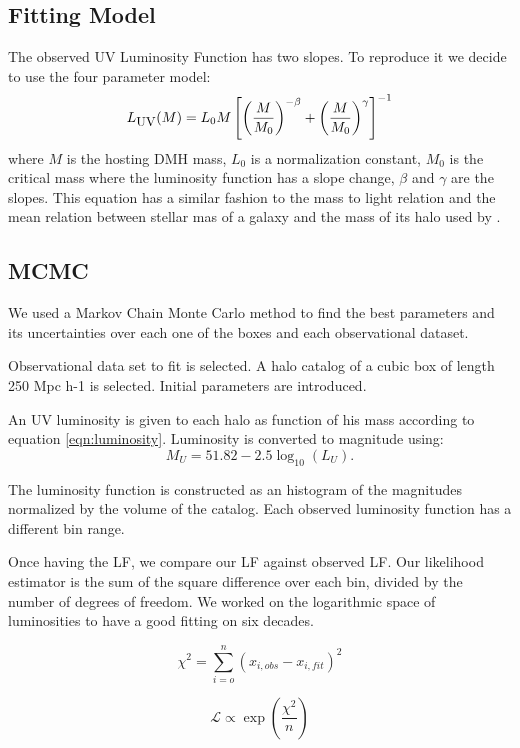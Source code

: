 \subsection{Fitting Model}

The observed UV Luminosity Function has two slopes. To reproduce it we decide to use the four parameter model:
  \begin{equation}\label{eqn:luminosity}
  L_{\textrm{\small{UV}}} (M) = L_{0} M \left[ \left( \frac{M}{M_0}\right)^{-\beta} 
		   + \left( \frac{M}{M_0}\right)^{\gamma} 
               \right]^{-1}
  \end{equation}
where $M$ is the hosting DMH mass, $L_{0}$ is a normalization constant, $M_0$
is the critical mass where the luminosity function has a slope change, 
$\beta$ and $\gamma$ are the slopes. This equation has a similar fashion to the
mass to light relation \citep{vandenbosch03} and the mean relation between
stellar mas of a galaxy and the mass of its halo used by \citet{moster10}.


\subsection{MCMC}
We used a Markov Chain Monte Carlo method to find the best parameters and its 
uncertainties over each one of the boxes and each observational dataset.

Observational data set to fit is selected.
A halo catalog of a cubic box of length 250 Mpc h-1 is selected.
Initial parameters are introduced.

An UV luminosity is given to each halo as function of his mass according to equation
 \ref{eqn:luminosity}.
Luminosity is converted to magnitude using:
  \[ M_{U} = 51.82 - 2.5 \log_{10}(L_{U}). \]

The luminosity function is constructed as an histogram of the magnitudes normalized by 
the volume of the catalog. Each observed luminosity function has a different bin range.

Once having the LF, we compare our LF against observed LF. Our likelihood estimator is 
the sum of the square difference over each bin, divided by the number of degrees of 
freedom. We worked on the logarithmic space of luminosities to have a good fitting on
six decades.

\[ \chi^2  = \sum_{i=o}^{n}\left( x_{i,obs} - x_{i,fit} \right)^2 \]


\[ \mathcal{L} \propto \exp \left( \frac{\chi ^2}{n} \right) \]

